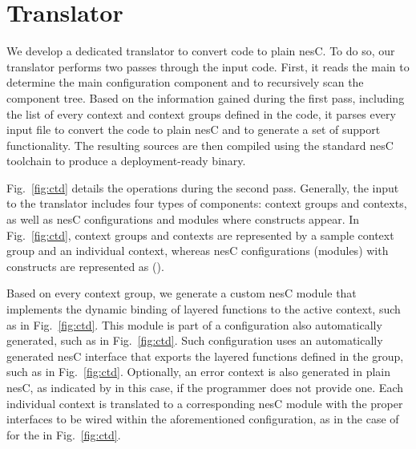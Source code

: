 \section{Translator}\label{sec:translator}

 We develop a dedicated translator to convert \conesc code to plain
 nesC. To do so, our translator performs two passes through the input
 code. First, it reads the main  to determine the main
 configuration component and to recursively scan the component
 tree. Based on the information gained during the first pass,
 including the list of every context and context groups defined in the
 code, it parses every input file to convert the \conesc code to plain
 nesC and to generate a set of support functionality. The resulting
 sources are then compiled using the standard nesC toolchain to
 produce a deployment-ready binary.


Fig.~\ref{fig:ctd} details the operations during the second
pass. Generally, the input to the translator includes four types of
components: context groups and contexts, as well as nesC
configurations and modules where \conesc constructs appear.  In
Fig.~\ref{fig:ctd}, context groups and contexts are represented by a
sample  context group and an individual 
context, whereas nesC configurations (modules) with \conesc
constructs are represented as  ().

Based on every context group, we generate a custom nesC module that
implements the dynamic binding of layered functions to the active
context, such as  in Fig.~\ref{fig:ctd}. This
module is part of a configuration also automatically generated, such
as  in Fig.~\ref{fig:ctd}. Such configuration
uses an automatically generated nesC interface that exports the
layered functions defined in the group, such as 
in Fig.~\ref{fig:ctd}. Optionally, an error context is also generated
in plain nesC, as indicated by  in this case, if
the programmer does not provide one. Each individual context is 
translated to a corresponding nesC module with the proper interfaces
to be wired within the aforementioned configuration, as in the case of
 for the  in
Fig.~\ref{fig:ctd}.

